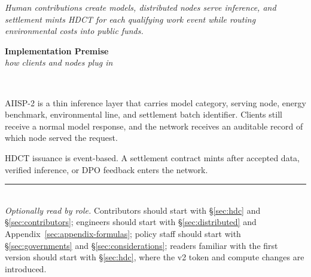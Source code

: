\documentclass[10pt,a4paper,twocolumn]{article}
\begin{document}
\begin{minipage}[t]{0.55\textwidth}

\vspace{0.4em}
{\scriptsize\itshape Human contributions create models, distributed nodes serve inference, and settlement mints HDCT for each qualifying work event while routing environmental costs into public funds.}
\end{minipage}%
\hfill
\begin{minipage}[t]{0.41\textwidth}
\vspace{0pt}
\centering
{\normalsize\bfseries Implementation Premise}\\[3pt]
{\scriptsize\itshape how clients and nodes plug in}\\[30pt]
\raggedright
{}\\[20pt]
{\small AIISP-2 is a thin inference layer that carries model category, serving node, energy benchmark, environmental line, and settlement batch identifier. Clients still receive a normal model response, and the network receives an auditable record of which node served the request.\par
\vspace{20pt}
HDCT issuance is event-based. A settlement contract mints after accepted data, verified inference, or DPO feedback enters the network.}
\end{minipage}

\vfill
\noindent\rule{0.4\textwidth}{0.3pt}\\[6pt]
{\scriptsize\itshape Optionally read by role.} {\scriptsize Contributors should start with \S\ref{sec:hdc} and \S\ref{sec:contributors}; engineers should start with \S\ref{sec:distributed} and Appendix~\ref{sec:appendix-formulas}; policy staff should start with \S\ref{sec:governments} and \S\ref{sec:considerations}; readers familiar with the first version should start with \S\ref{sec:hdc}, where the v2 token and compute changes are introduced.}
\vspace{1.5em}
\end{document}
